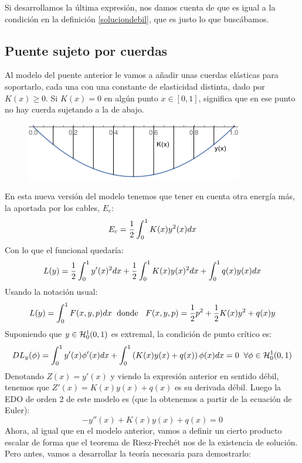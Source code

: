 Si desarrollamos la última expresión, nos damos cuenta de que es igual a la condición en la definición \ref{soluciondebil}, que es justo lo que buscábamos.

\subsection{Puente sujeto por cuerdas}

Al modelo del puente anterior le vamos a añadir unas cuerdas elásticas para soportarlo, cada una con una constante de elasticidad distinta, dado por $K(x)\geq 0$.
Si $K(x)=0$ en algún punto $x\in[0,1]$, significa que en ese punto no hay cuerda sujetando a la de abajo.
\begin{figure}[H]
   \center
  \includegraphics[scale=0.6]{img/puentecuerdas.png}
\end{figure}
En esta nueva versión del modelo tenemos que tener en cuenta otra energía más, la aportada por los cables, $E_c$:
\[
E_c=\frac{1}{2}\integral{0}{1}{K(x)y^2(x)dx}
\]
Con lo que el funcional quedaría:
\[
L(y)=\frac{1}{2}\integral{0}{1}{y'(x)^2dx}+\frac{1}{2}\integral{0}{1}{K(x)y(x)^2dx}+\integral{0}{1}{q(x)y(x)dx}
\]
Usando la notación usual:
\begin{equation}\label{funcionalpuente}
L(y)=\integral{0}{1}{F(x,y,p)dx} \; \text{ donde } \;\; F(x,y,p)=\frac{1}{2}p^2+\frac{1}{2}K(x)y^2+q(x)y
\end{equation}
Suponiendo que $y\in\sobolevcero[0,1]{1}$ es extremal, la condición de punto crítico es:
\[
DL_y(\phi)=\integral{0}{1}{y'(x)\phi'(x)dx}+\integral{0}{1}{\left(K(x)y(x)+q(x)\right)\phi(x)dx}=0 \;\; \forall \phi\in\sobolevcero[0,1]{1}
\]
Denotando $Z(x)=y'(x)$ y viendo la expresión anterior en sentido débil, tenemos que $Z'(x)=K(x)y(x)+q(x)$ es su derivada débil. Luego la EDO de orden 2 de este modelo es (que la obtenemos a partir de la ecuación de Euler):
\[
-y''(x)+K(x)y(x)+q(x)=0
\]
Ahora, al igual que en el modelo anterior, vamos a definir un cierto producto escalar de forma que el teorema de Riesz-Frechét nos de la existencia de solución. Pero antes, vamos a desarrollar la teoría necesaria para demostrarlo:

